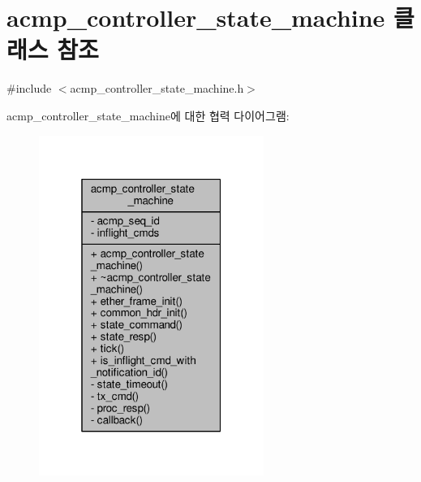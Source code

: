 \hypertarget{classavdecc__lib_1_1acmp__controller__state__machine}{}\section{acmp\+\_\+controller\+\_\+state\+\_\+machine 클래스 참조}
\label{classavdecc__lib_1_1acmp__controller__state__machine}


{\ttfamily \#include $<$acmp\+\_\+controller\+\_\+state\+\_\+machine.\+h$>$}



acmp\+\_\+controller\+\_\+state\+\_\+machine에 대한 협력 다이어그램\+:
\nopagebreak
\begin{figure}[H]
\begin{center}
\leavevmode
\includegraphics[width=208pt]{classavdecc__lib_1_1acmp__controller__state__machine__coll__graph}
\end{center}
\end{figure}
